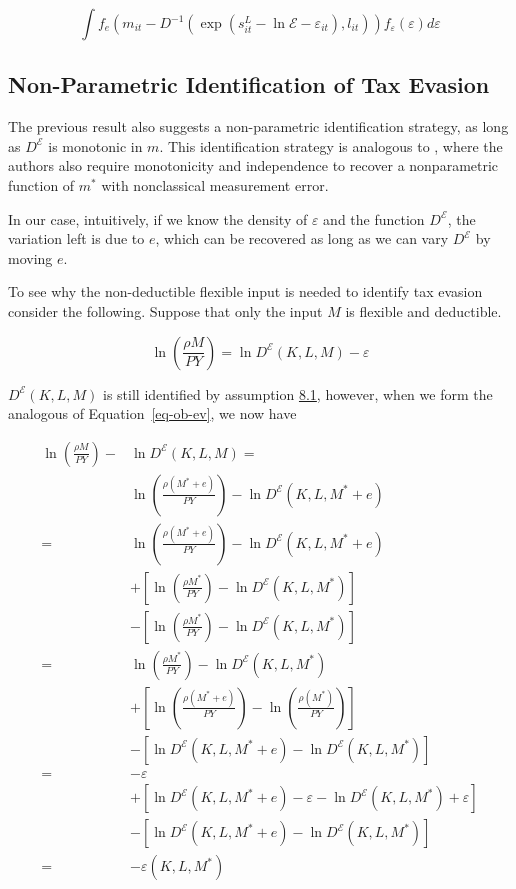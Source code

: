 \documentclass[
  12pt]{article}
\theoremstyle{definition}
\theoremstyle{remark}
\begin{document}
\[
    \int f_e(m_{it}-D^{-1}(\exp(s^L_{it}-\ln\mathcal{E}-\varepsilon_{it}),l_{it})) f_{\varepsilon}(\varepsilon)d\varepsilon
\]

\subsection{Non-Parametric Identification of Tax
Evasion}\label{non-parametric-identification-of-tax-evasion}

The previous result also suggests a non-parametric identification
strategy, as long as \(D^{\mathcal{E}}\) is monotonic in \(m\). This
identification strategy is analogous to \citet{Hu2022b}, where the
authors also require monotonicity and independence to recover a
nonparametric function of \(m^*\) with nonclassical measurement error.

In our case, intuitively, if we know the density of \(\varepsilon\) and
the function \(D^{\mathcal{E}}\), the variation left is due to \(e\),
which can be recovered as long as we can vary \(D^{\mathcal{E}}\) by
moving \(e\).

To see why the non-deductible flexible input is needed to identify tax
evasion consider the following. Suppose that only the input \(M\) is
flexible and deductible.

\[
\ln\left(\frac{\rho M}{PY}\right)=\ln D^{\mathcal{E}}(K,L,M)-\varepsilon
\]

\(D^{\mathcal{E}}(K,L,M)\) is still identified by assumption
\hyperref[ass-non-ev]{8.1}, however, when we form the analogous of
Equation~\ref{eq-ob-ev}, we now have

\[
\begin{aligned}
\ln\left(\frac{\rho M}{PY}\right)-&\ln D^{\mathcal{E}}(K,L,M)=\\
&\ln\left(\frac{\rho(M^*+e)}{PY}\right)-\ln D^{\mathcal{E}}(K,L,M^*+e)\\
=&\ln\left(\frac{\rho(M^*+e)}{PY}\right)-\ln D^{\mathcal{E}}(K,L,M^*+e)\\
&+\left[\ln\left(\frac{\rho M^*}{PY}\right)-\ln D^{\mathcal{E}}(K,L,M^*)\right]\\
&-\left[\ln\left(\frac{\rho M^*}{PY}\right)-\ln D^{\mathcal{E}}(K,L,M^*)\right] \\
=&\ln\left(\frac{\rho M^*}{PY}\right)-\ln D^{\mathcal{E}}(K,L,M^*) \\
&+\left[\ln\left(\frac{\rho(M^*+e)}{PY}\right)-\ln\left(\frac{\rho(M^*)}{PY}\right)\right]\\
&-\left[\ln D^{\mathcal{E}}(K,L,M^*+e)-\ln D^{\mathcal{E}}(K,L,M^*)\right]\\
=& -\varepsilon \\
&+\left[\ln D^{\mathcal{E}}(K,L,M^*+e)-\varepsilon-\ln D^{\mathcal{E}}(K,L,M^*)+\varepsilon\right]\\
&-\left[\ln D^{\mathcal{E}}(K,L,M^*+e)-\ln D^{\mathcal{E}}(K,L,M^*)\right]\\
=& -\varepsilon(K,L,M^*)
\end{aligned}
\]
\end{document}
